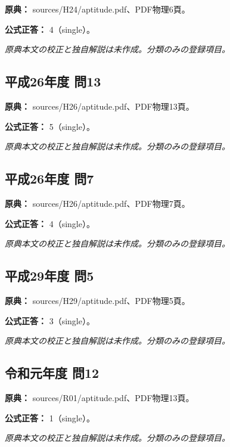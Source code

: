 \noindent\textbf{原典：} sources/H24/aptitude.pdf、PDF物理6頁。

\textbf{公式正答：} 4（single）。

\par\textit{原典本文の校正と独自解説は未作成。分類のみの登録項目。}

\subsection{平成26年度 問13}
\label{q:h26-reg-apt-13}

\noindent\textbf{原典：} sources/H26/aptitude.pdf、PDF物理13頁。

\textbf{公式正答：} 5（single）。

\par\textit{原典本文の校正と独自解説は未作成。分類のみの登録項目。}

\subsection{平成26年度 問7}
\label{q:h26-reg-apt-07}

\noindent\textbf{原典：} sources/H26/aptitude.pdf、PDF物理7頁。

\textbf{公式正答：} 4（single）。

\par\textit{原典本文の校正と独自解説は未作成。分類のみの登録項目。}

\subsection{平成29年度 問5}
\label{q:h29-reg-apt-05}

\noindent\textbf{原典：} sources/H29/aptitude.pdf、PDF物理5頁。

\textbf{公式正答：} 3（single）。

\par\textit{原典本文の校正と独自解説は未作成。分類のみの登録項目。}

\subsection{令和元年度 問12}
\label{q:r01-reg-apt-12}

\noindent\textbf{原典：} sources/R01/aptitude.pdf、PDF物理13頁。

\textbf{公式正答：} 1（single）。

\par\textit{原典本文の校正と独自解説は未作成。分類のみの登録項目。}

